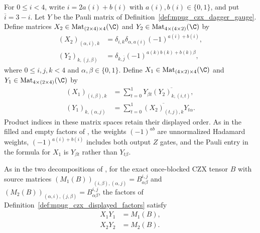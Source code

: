 \begin{definition}
    \label{def:mpug_czx_displayed_factors}
    \leanok
    For $0\leq i<4$, write $i=2a(i)+b(i)$ with $a(i),b(i)\in\{0,1\}$,
    and put $\overline i=3-i$. Let $Y$ be the Pauli matrix of
    Definition~\ref{def:mpug_czx_dagger_gauge}. Define matrices
    $X_2\in\operatorname{Mat}_{(2\times4)\times4}(\C)$ and
    $Y_2\in\operatorname{Mat}_{4\times(4\times2)}(\C)$ by
    \begin{align}
        (X_2)_{(\alpha,i),k}
         & =\delta_{i,k}\delta_{\alpha,a(i)}(-1)^{a(i)+b(i)}, \\
        (Y_2)_{k,(j,\beta)}
         & =\delta_{k,\overline j}(-1)^{a(k)b(k)+b(k)\beta},
    \end{align}
    where $0\leq i,j,k<4$ and $\alpha,\beta\in\{0,1\}$. Define
    $X_1\in\operatorname{Mat}_{(4\times2)\times4}(\C)$ and
    $Y_1\in\operatorname{Mat}_{4\times(2\times4)}(\C)$ by
    \begin{align}
        (X_1)_{(i,\beta),k}
         & =\sum_{t=0}^1Y_{\beta t}\overline{(Y_2)_{k,(i,t)}}, \\
        (Y_1)_{k,(\alpha,j)}
         & =\sum_{t=0}^1\overline{(X_2)_{(t,j),k}}Y_{t\alpha}.
    \end{align}
    Product indices in these matrix spaces retain their displayed order.
    As in the filled and empty factors of
    \cite[lines~4559--4659]{FrancoRubio2025MPUGauging}, the weights
    $(-1)^{ab}$ are unnormalized Hadamard weights, $(-1)^{a(i)+b(i)}$
    includes both output $Z$ gates, and the Pauli entry in the formula for
    $X_1$ is $Y_{\beta t}$ rather than $Y_{t\beta}$.
\end{definition}

\begin{lemma}
    \label{thm:mpug_czx_displayed_cuts}
    \leanok
    As in the two decompositions of
    \cite[lines~4559--4659]{FrancoRubio2025MPUGauging}, for the exact
    once-blocked CZX tensor $B$ with source matrices
    $(M_1(B))_{(i,\beta),(\alpha,j)}=B^{i,j}_{\alpha\beta}$ and
    $(M_2(B))_{(\alpha,i),(j,\beta)}=B^{i,j}_{\alpha\beta}$, the factors of
    Definition~\ref{def:mpug_czx_displayed_factors} satisfy
    \begin{align}
        X_1Y_1 & =M_1(B), \\
        X_2Y_2 & =M_2(B).
    \end{align}
\end{lemma}

